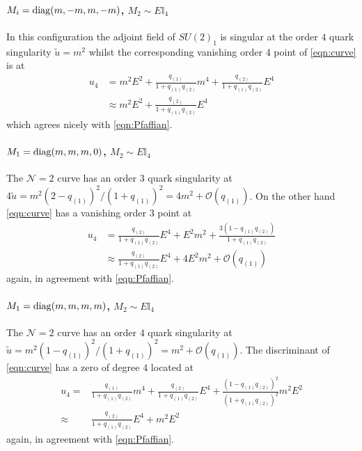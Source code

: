 \documentclass[main.tex]{subfiles}
\begin{document}
\paragraph{$M_i=\operatorname{diag}(m,-m,m,-m)$, $M_2\sim E\mathbb{I}_4$}
In this configuration the adjoint field of $SU(2)_1$ is singular at the order $4$ quark singularity $\tilde{u}=m^2$ whilst the corresponding vanishing order $4$ point of \eqref{eqn:curve} is at 
\begin{equation}
\begin{aligned}
u_4&=m^2E^2+\frac{q_{(1)}}{1+q_{(1)}q_{(2)}}m^4+\frac{q_{(2)}}{1+q_{(1)}q_{(2)}}E^4\\
&\approx m^2E^2+\frac{q_{(2)}}{1+q_{(1)}q_{(2)}}E^4
\end{aligned}
\end{equation}
which agrees nicely with \eqref{eqn:Pfaffian}.

\paragraph{$M_1=\operatorname{diag}(m,m,m,0)$, $M_2\sim E\mathbb{I}_4$}
The $\mathcal{N}=2$ curve has an order $3$ quark singularity at $4\widetilde{u}=m^2(2-q_{(1)})^2/(1+q_{(1)})^2= 4m^2+\mathcal{O}(q_{(1)})$. On the other hand \eqref{eqn:curve} has a vanishing order $3$ point at
\begin{equation}
\begin{aligned}
u_4&=\frac{q_{(2)}}{1+q_{(1)}q_{(2)}}E^4+E^2m^2+\frac{3(1-q_{(1)}q_{(2)})}{1+q_{(1)}q_{(2)}}\\
&\approx \frac{q_{(2)}}{1+q_{(1)}q_{(2)}}E^4+4E^2m^2+\mathcal{O}(q_{(1)})
\end{aligned}
\end{equation}
again, in agreement with \eqref{eqn:Pfaffian}.

\paragraph{$M_1=\operatorname{diag}(m,m,m,m)$, $M_2\sim E\mathbb{I}_4$}
The $\mathcal{N}=2$ curve has an order $4$ quark singularity at $\widetilde{u}=m^2(1-q_{(1)})^2/(1+q_{(1)})^2=m^2+\mathcal{O}(q_{(1)})$. The discriminant of \eqref{eqn:curve} has a zero of degree $4$ located at
\begin{equation}
\begin{aligned}
u_4=&\frac{q_{(1)}}{1+q_{(1)}q_{(2)}}m^4+\frac{q_{(2)}}{1+q_{(1)}q_{(2)}}E^4+\frac{(1-q_{(1)}q_{(2)})^2}{(1+q_{(1)}q_{(2)})^2}m^2E^2\\
\approx& \frac{q_{(2)}}{1+q_{(1)}q_{(2)}}E^4+m^2E^2
\end{aligned}
\end{equation}
again, in agreement with \eqref{eqn:Pfaffian}.
\end{document}
